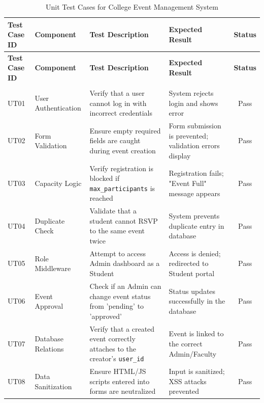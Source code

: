 \begin{longtable}{|p{1.5cm}|p{2.5cm}|p{4cm}|p{4cm}|c|}
    
    \hline
    \textbf{Test Case ID} & \textbf{Component} & \textbf{Test Description} & \textbf{Expected Result} & \textbf{Status} \\
    \hline
    \endfirsthead

    \hline
    \textbf{Test Case ID} & \textbf{Component} & \textbf{Test Description} & \textbf{Expected Result} & \textbf{Status} \\
    \hline
    \endhead

    \hline
    
    \endfoot

    \hline
    \caption{Unit Test Cases for College Event Management System} \label{tab:unit_tests} \\
    \endlastfoot

    UT01 & User Authentication & \raggedright Verify that a user cannot log in with incorrect credentials & \raggedright System rejects login and shows error & Pass \\
    \hline
    UT02 & Form Validation & \raggedright Ensure empty required fields are caught during event creation & \raggedright Form submission is prevented; validation errors display & Pass \\
    \hline
    UT03 & Capacity Logic & \raggedright Verify registration is blocked if \texttt{max\_participants} is reached & \raggedright Registration fails; "Event Full" message appears & Pass \\
    \hline
    UT04 & Duplicate Check & \raggedright Validate that a student cannot RSVP to the same event twice & \raggedright System prevents duplicate entry in database & Pass \\
    \hline
    UT05 & Role Middleware & \raggedright Attempt to access Admin dashboard as a Student & \raggedright Access is denied; redirected to Student portal & Pass \\
    \hline
    UT06 & Event Approval & \raggedright Check if an Admin can change event status from 'pending' to 'approved' & \raggedright Status updates successfully in the database & Pass \\
    \hline
    UT07 & Database Relations & \raggedright Verify that a created event correctly attaches to the creator's \texttt{user\_id} & \raggedright Event is linked to the correct Admin/Faculty & Pass \\
    \hline
    UT08 & Data Sanitization & \raggedright Ensure HTML/JS scripts entered into forms are neutralized & \raggedright Input is sanitized; XSS attacks prevented & Pass \\
    \end{longtable}

